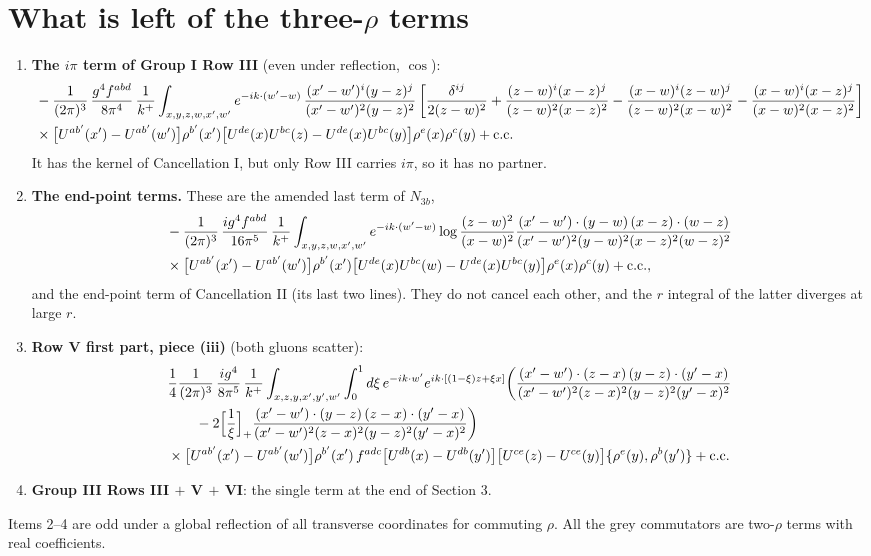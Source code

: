 \documentclass[10pt]{article}
\begin{document}
\section{What is left of the three-$\rho$ terms}
\begin{enumerate}
\item \textbf{The $i\pi$ term of Group I Row III} (even under reflection, $\cos$):
\begin{align}
&-\frac{1}{(2\pi)^{3}}\,\frac{g^{4}f^{abd}}{8\pi^{4}}\,\frac{1}{k^{+}}\int_{x,y,z,w,x',w'}e^{-ik\cdot(w'-w)}\,\frac{(x'-w')^{i}(y-z)^{j}}{(x'-w')^{2}(y-z)^{2}}\,\bigg[\frac{\delta^{ij}}{2(z-w)^{2}}+\frac{(z-w)^{i}(x-z)^{j}}{(z-w)^{2}(x-z)^{2}}-\frac{(x-w)^{i}(z-w)^{j}}{(z-w)^{2}(x-w)^{2}}-\frac{(x-w)^{i}(x-z)^{j}}{(x-w)^{2}(x-z)^{2}}\bigg]\notag\\
&\times\big[U^{ab'}(x')-U^{ab'}(w')\big]\rho^{b'}(x')\big[U^{de}(x)U^{bc}(z)-U^{de}(x)U^{bc}(y)\big]\rho^{e}(x)\rho^{c}(y)+{\rm c.c.}
\end{align}
It has the kernel of Cancellation I, but only Row III carries $i\pi$, so it has no partner.
\item \textbf{The end-point terms.} These are the amended last term of $N_{3b}$,
\begin{align}
&-\frac{1}{(2\pi)^{3}}\,\frac{ig^{4}f^{abd}}{16\pi^{5}}\,\frac{1}{k^{+}}\int_{x,y,z,w,x',w'}e^{-ik\cdot(w'-w)}\log\frac{(z-w)^{2}}{(x-w)^{2}}\frac{(x'-w')\cdot(y-w)\,(x-z)\cdot(w-z)}{(x'-w')^{2}(y-w)^{2}(x-z)^{2}(w-z)^{2}}\notag\\
&\times\big[U^{ab'}(x')-U^{ab'}(w')\big]\rho^{b'}(x')\big[U^{de}(x)U^{bc}(w)-U^{de}(x)U^{bc}(y)\big]\rho^{e}(x)\rho^{c}(y)+{\rm c.c.},
\end{align}
and the end-point term of Cancellation II (its last two lines). They do not cancel each other, and the $r$ integral of the latter diverges at large $r$.
\item \textbf{Row V first part, piece (iii)} (both gluons scatter):
\begin{align}
&\frac14\frac{1}{(2\pi)^{3}}\,\frac{ig^{4}}{8\pi^{5}}\,\frac{1}{k^{+}}\int_{x,z,y,x',y',w'}\int_{0}^{1}d\xi\,e^{-ik\cdot w'}e^{ik\cdot[(1-\xi)z+\xi x]}\bigg(\frac{(x'-w')\cdot(z-x)\,(y-z)\cdot(y'-x)}{(x'-w')^{2}(z-x)^{2}(y-z)^{2}(y'-x)^{2}}\notag\\
&\qquad-2\Big[\frac1\xi\Big]_{+}\frac{(x'-w')\cdot(y-z)\,(z-x)\cdot(y'-x)}{(x'-w')^{2}(z-x)^{2}(y-z)^{2}(y'-x)^{2}}\bigg)\notag\\
&\times\big[U^{ab'}(x')-U^{ab'}(w')\big]\rho^{b'}(x')\,f^{adc}\big[U^{db}(x)-U^{db}(y')\big]\big[U^{ce}(z)-U^{ce}(y)\big]\{\rho^{e}(y),\rho^{b}(y')\}+{\rm c.c.}
\end{align}
\item \textbf{Group III Rows III $+$ V $+$ VI}: the single term at the end of Section 3.
\end{enumerate}
Items 2--4 are odd under a global reflection of all transverse coordinates for commuting $\rho$. All the grey commutators are two-$\rho$ terms with real coefficients.
\end{document}
